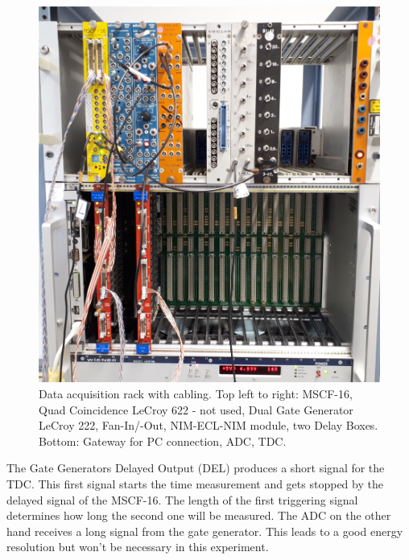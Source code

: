 \documentclass[]{article}
\begin{document}
\begin{figure}[H]
\centering
\includegraphics[width=1\textwidth]{Plots/Kabel2.jpg}
\caption{Data acquisition rack with cabling. Top left to right: MSCF-16, Quad Coincidence LeCroy 622 - not used, Dual Gate Generator LeCroy 222, Fan-In/-Out, NIM-ECL-NIM
module, two Delay Boxes.
Bottom: Gateway for PC connection, ADC, TDC.  }
\label{fig:cabling}
\end{figure}

The Gate Generators Delayed Output (DEL) produces a short signal for the TDC. This first signal starts the time measurement and gets stopped by the delayed signal of the MSCF-16. The length of the first triggering signal determines how long the second one will be measured. The ADC on the other hand receives a long signal from the gate generator. This leads to a good energy resolution but won't be necessary in this experiment.
\end{document}
